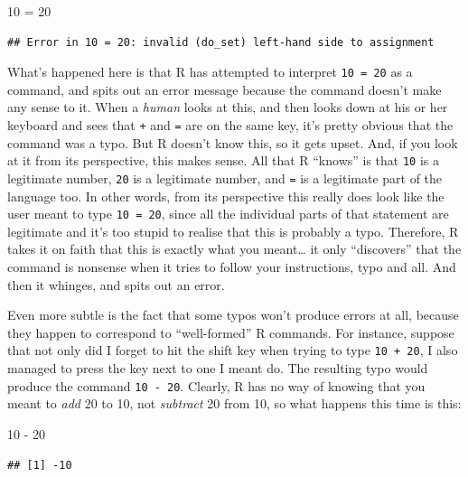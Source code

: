 \documentclass[
]{book}
\newenvironment{Shaded}{\begin{snugshade}}{\end{snugshade}}
\newcommand{\DecValTok}[1]{\textcolor[rgb]{0.00,0.00,0.81}{#1}}
\newcommand{\OtherTok}[1]{\textcolor[rgb]{0.56,0.35,0.01}{#1}}
\newcommand{\SpecialCharTok}[1]{\textcolor[rgb]{0.00,0.00,0.00}{#1}}
\begin{document}
\begin{Shaded}
\begin{Highlighting}[]
\DecValTok{10} \OtherTok{=} \DecValTok{20}
\end{Highlighting}
\end{Shaded}

\begin{verbatim}
## Error in 10 = 20: invalid (do_set) left-hand side to assignment
\end{verbatim}

What's happened here is that R has attempted to interpret \texttt{10\ =\ 20} as a command, and spits out an error message because the command doesn't make any sense to it. When a \emph{human} looks at this, and then looks down at his or her keyboard and sees that \texttt{+} and \texttt{=} are on the same key, it's pretty obvious that the command was a typo. But R doesn't know this, so it gets upset. And, if you look at it from its perspective, this makes sense. All that R ``knows'' is that \texttt{10} is a legitimate number, \texttt{20} is a legitimate number, and \texttt{=} is a legitimate part of the language too. In other words, from its perspective this really does look like the user meant to type \texttt{10\ =\ 20}, since all the individual parts of that statement are legitimate and it's too stupid to realise that this is probably a typo. Therefore, R takes it on faith that this is exactly what you meant\ldots{} it only ``discovers'' that the command is nonsense when it tries to follow your instructions, typo and all. And then it whinges, and spits out an error.

Even more subtle is the fact that some typos won't produce errors at all, because they happen to correspond to ``well-formed'' R commands. For instance, suppose that not only did I forget to hit the shift key when trying to type \texttt{10\ +\ 20}, I also managed to press the key next to one I meant do. The resulting typo would produce the command \texttt{10\ -\ 20}. Clearly, R has no way of knowing that you meant to \emph{add} 20 to 10, not \emph{subtract} 20 from 10, so what happens this time is this:

\begin{Shaded}
\begin{Highlighting}[]
\DecValTok{10} \SpecialCharTok{{-}} \DecValTok{20}
\end{Highlighting}
\end{Shaded}

\begin{verbatim}
## [1] -10
\end{verbatim}
\end{document}

